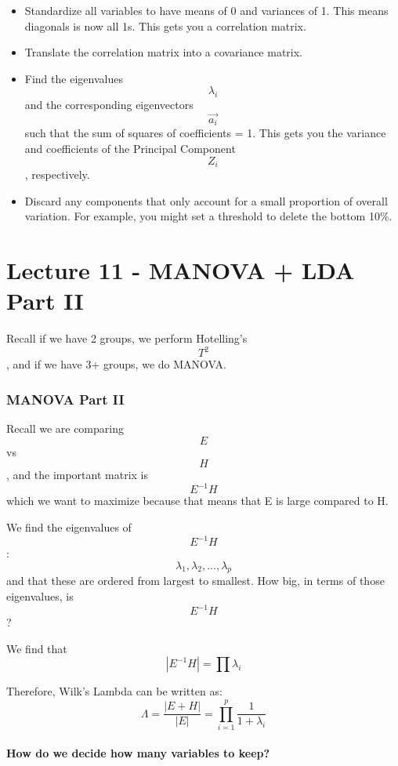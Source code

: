 \documentclass[]{article}
\providecommand{\tightlist}{%
  \setlength{\itemsep}{0pt}\setlength{\parskip}{0pt}}
\let\oldparagraph\paragraph
\renewcommand{\paragraph}[1]{\oldparagraph{#1}\mbox{}}
\begin{document}
\begin{itemize}
\tightlist
\item
  Standardize all variables to have means of 0 and variances of 1. This
  means diagonals is now all 1s. This gets you a correlation matrix.
\item
  Translate the correlation matrix into a covariance matrix.
\item
  Find the eigenvalues \[\lambda_i\] and the corresponding eigenvectors
  \[\vec{a_i}\] such that the sum of squares of coefficients = 1. This
  gets you the variance and coefficients of the Principal Component
  \[Z_i\], respectively.
\item
  Discard any components that only account for a small proportion of
  overall variation. For example, you might set a threshold to delete
  the bottom 10\%.
\end{itemize}

\hypertarget{lecture-11---manova-lda-part-ii}{%
\section{Lecture 11 - MANOVA + LDA Part
II}\label{lecture-11---manova-lda-part-ii}}

Recall if we have 2 groups, we perform Hotelling's \[T^2\], and if we
have 3+ groups, we do MANOVA.

\hypertarget{manova-part-ii}{%
\subsubsection{\texorpdfstring{MANOVA \textbf{Part
II}}{MANOVA Part II}}\label{manova-part-ii}}

Recall we are comparing \[E\] vs \[H\], and the important matrix is
\[E^{-1}H\] which we want to maximize because that means that E is large
compared to H.

We find the eigenvalues of \[E^{-1}H\]:
\[\lambda_1, \lambda_2, ..., \lambda_p\] and that these are ordered from
largest to smallest. How big, in terms of those eigenvalues, is
\[E^{-1}H\]?

We find that \[| E^{-1}H | = \prod \lambda_i\]

Therefore, Wilk's Lambda can be written as:
\[\Lambda = \frac{| E + H |}{| E |} = \prod_{i = 1}^p \frac{1}{1 + \lambda_i}\]

\hypertarget{how-do-we-decide-how-many-variables-to-keep}{%
\paragraph{How do we decide how many variables to
keep?}\label{how-do-we-decide-how-many-variables-to-keep}}
\end{document}
